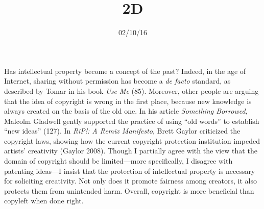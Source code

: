 \documentclass{writing}
\title{2D}
\date{02/10/16}
\begin{document}
\maketitle

Has intellectual property become a concept of the past? Indeed, in the
age of Internet, sharing without permission has become a \emph{de facto}
standard, as described by Tomar in his book \emph{Use Me} (85).
Moreover, other people are arguing that the idea of copyright is wrong
in the first place, because new knowledge is always created on the basis
of the old one. In his article \emph{Something Borrowed}, Malcolm
Gladwell gently supported the practice of using ``old words'' to
establish ``new ideas'' (127). In \emph{RiP!: A Remix Manifesto}, Brett
Gaylor criticized the copyright laws, showing how the current copyright
protection institution impeded artists' creativity (Gaylor 2008). Though
I partially agree with the view that the domain of copyright should be
limited---more specifically, I disagree with patenting ideas---I insist
that the protection of intellectual property is necessary for soliciting
creativity. Not only does it promote fairness among creators, it also
protects them from unintended harm. Overall, copyright is more
beneficial than copyleft when done right.
\end{document}
